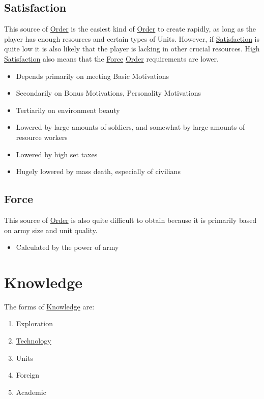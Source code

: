 \documentclass[11pt]{article}
\begin{document}
\subsection{Satisfaction \label{orgda5f73b} \label{orgc4f5275}}
\label{sec:org308ab23}
This source of \hyperref[orgd146db7]{Order} is the easiest kind of \hyperref[orgd146db7]{Order} to create rapidly, as long as the player has enough resources and certain types of Units. However, if \hyperref[orgda5f73b]{Satisfaction} is quite low it is also likely that the player is lacking in other crucial resources. High \hyperref[orgda5f73b]{Satisfaction} also means that the \hyperref[org3090cf7]{Force} \hyperref[orgd146db7]{Order} requirements are lower.\\
\begin{itemize}
\item Depends primarily on meeting Basic Motivations\\
\item Secondarily on Bonus Motivations, Personality Motivations\\
\item Tertiarily on environment beauty\\
\item Lowered by large amounts of soldiers, and somewhat by large amounts of resource workers\\
\item Lowered by high set taxes\\
\item Hugely lowered by mass death, especially of civilians\\
\end{itemize}
\subsection{Force \label{org3090cf7} \label{orgc687d6b}}
\label{sec:orge0fccfe}
This source of \hyperref[orgd146db7]{Order} is also quite difficult to obtain because it is primarily based on army size and unit quality.\\
\begin{itemize}
\item Calculated by the power of army\\
\end{itemize}
\section{Knowledge \label{orgd7203c2} \label{orgdeeffd0}}
\label{sec:org987276b}
The forms of \hyperref[orgd7203c2]{Knowledge} are:\\
\begin{enumerate}
\item Exploration\\
\item \hyperref[org85e435a]{Technology}\\
\item Units\\
\item Foreign\\
\item Academic\\
\end{enumerate}
\end{document}
